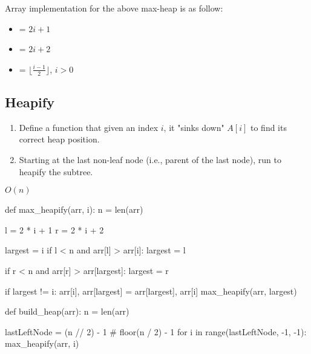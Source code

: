 Array implementation for the above max-heap is as follow:

\begin{itemize}
  \item {} = $2i + 1$
  \item {} = $2i + 2$
  \item {} = $\lfloor \frac{i - 1}{2} \rfloor$, $i > 0$
\end{itemize}

\subsection{Heapify}

\begin{enumerate}
  \item Define a function  that given an index $i$, it "sinks down" $A[i]$ to find its correct heap position.
  \item Starting at the last non-leaf node (i.e., parent of the last node), run  to heapify the subtree.
  
\end{enumerate}
$O(n)$

\begin{python}
def max_heapify(arr, i):
    n = len(arr)

    l = 2 * i + 1
    r = 2 * i + 2

    largest = i
    if l < n and arr[l] > arr[i]:
        largest = l

    if r < n and arr[r] > arr[largest]:
        largest = r

    if largest != i:
        arr[i], arr[largest] = arr[largest], arr[i]
        max_heapify(arr, largest)


def build_heap(arr):
    n = len(arr)

    lastLeftNode = (n // 2) - 1  # floor(n / 2) - 1
    for i in range(lastLeftNode, -1, -1):
        max_heapify(arr, i)
\end{python}

\noindent

